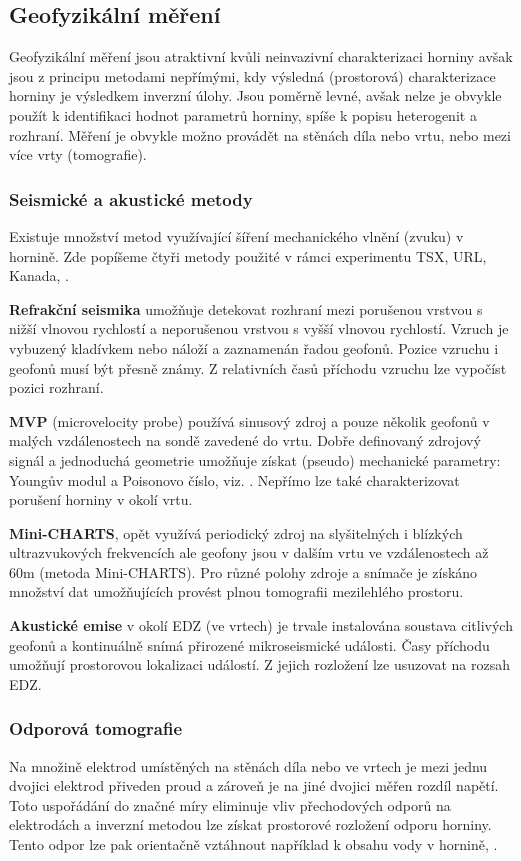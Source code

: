 \documentclass{article}
\begin{document}
\subsection{Geofyzikální měření}
Geofyzikální měření jsou atraktivní kvůli neinvazivní charakterizaci horniny
avšak jsou z principu metodami nepřímými, kdy výsledná (prostorová) charakterizace
horniny je výsledkem inverzní úlohy. Jsou poměrně levné, avšak nelze je obvykle použít k identifikaci 
hodnot parametrů horniny, spíše k popisu heterogenit a rozhraní. Měření je obvykle možno provádět na stěnách díla nebo 
vrtu, nebo mezi více vrty (tomografie).

\subsubsection{Seismické a akustické metody}
Existuje množství metod využívající šíření mechanického vlnění (zvuku) v hornině. Zde popíšeme čtyři metody použité v rámci experimentu TSX, URL, Kanada,  \cite{Chandler2002}.

{\bf Refrakční seismika} umožňuje detekovat rozhraní mezi porušenou vrstvou s nižší vlnovou rychlostí a neporušenou vrstvou s vyšší vlnovou rychlostí. Vzruch je vybuzený kladívkem nebo náloží a zaznamenán řadou geofonů. 
Pozice vzruchu i geofonů musí být přesně známy. Z relativních časů příchodu vzruchu lze vypočíst pozici rozhraní.

{\bf MVP} (microvelocity probe) používá sinusový zdroj a pouze několik geofonů v malých vzdálenostech na sondě zavedené do vrtu. 
Dobře definovaný zdrojový signál a jednoduchá geometrie umožňuje získat (pseudo) mechanické parametry: Youngův modul a Poisonovo číslo, viz. \cite{Shao2008}. Nepřímo lze také charakterizovat porušení horniny v okolí vrtu.

{\bf Mini-CHARTS}, opět využívá periodický zdroj na slyšitelných i blízkých ultrazvukových frekvencích ale geofony jsou v dalším vrtu ve vzdálenostech až 60m (metoda Mini-CHARTS). Pro různé polohy zdroje a snímače je získáno množství dat umožňujících provést plnou tomografii mezilehlého prostoru.

{\bf  Akustické emise} v okolí EDZ (ve vrtech) je trvale instalována soustava citlivých geofonů a kontinuálně snímá přirozené mikroseismické události. Časy příchodu umožňují prostorovou lokalizaci událostí. Z jejich rozložení lze usuzovat na rozsah EDZ.

\subsubsection{Odporová tomografie}
Na množině elektrod umístěných na stěnách díla nebo ve vrtech je mezi jednu dvojici elektrod přiveden proud a zároveň je na jiné dvojici měřen rozdíl napětí. Toto uspořádání do značné míry eliminuje vliv přechodových odporů na elektrodách a inverzní metodou lze získat prostorové rozložení odporu horniny. Tento odpor lze pak orientačně vztáhnout například k obsahu vody v hornině, \cite{Kull2002}.
\end{document}
